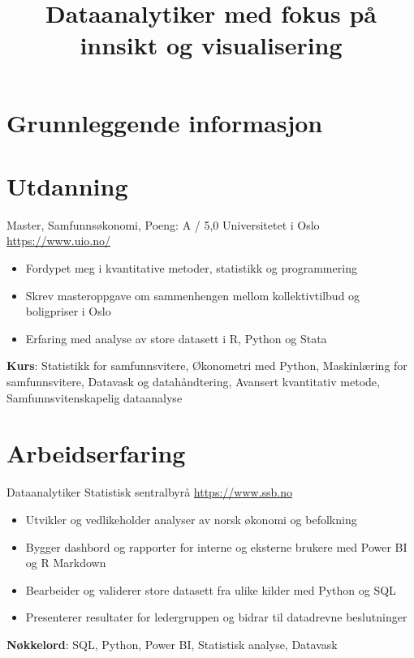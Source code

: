 \documentclass[a4paper, serif, 10pt]{moderncv}
\title{Dataanalytiker med fokus på innsikt og visualisering}
\begin{document}
\maketitle

\section{Grunnleggende informasjon}

\section{Utdanning}

        {Master, Samfunnsøkonomi, Poeng: A / 5,0}
        {Universitetet i Oslo}
        {\url{https://www.uio.no/}}
        {}
        {\begin{itemize}
\item Fordypet meg i kvantitative metoder, statistikk og programmering
\item Skrev masteroppgave om sammenhengen mellom kollektivtilbud og boligpriser i Oslo
\item Erfaring med analyse av store datasett i R, Python og Stata
\end{itemize}
\textbf{Kurs}: Statistikk for samfunnsvitere, Økonometri med Python, Maskinlæring for samfunnsvitere, Datavask og datahåndtering, Avansert kvantitativ metode, Samfunnsvitenskapelig dataanalyse}
\section{Arbeidserfaring}

        {Dataanalytiker}
        {Statistisk sentralbyrå}
        {\url{https://www.ssb.no}}
        {}
        {\begin{itemize}
\item Utvikler og vedlikeholder analyser av norsk økonomi og befolkning
\item Bygger dashbord og rapporter for interne og eksterne brukere med Power BI og R Markdown
\item Bearbeider og validerer store datasett fra ulike kilder med Python og SQL
\item Presenterer resultater for ledergruppen og bidrar til datadrevne beslutninger
\end{itemize}
\textbf{Nøkkelord}: SQL, Python, Power BI, Statistisk analyse, Datavask}
\end{document}
